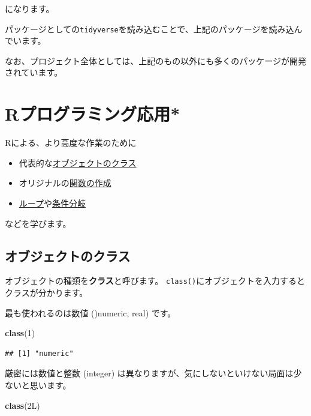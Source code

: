 \documentclass[]{bxjsreport}
\newenvironment{Shaded}{\begin{snugshade}}{\end{snugshade}}
\newcommand{\DecValTok}[1]{\textcolor[rgb]{0.00,0.00,0.81}{#1}}
\newcommand{\KeywordTok}[1]{\textcolor[rgb]{0.13,0.29,0.53}{\textbf{#1}}}
\newcommand{\NormalTok}[1]{#1}
\providecommand{\tightlist}{%
  \setlength{\itemsep}{0pt}\setlength{\parskip}{0pt}}
\let\asdf\section
\renewcommand{\section}{\chapter}
\renewcommand{\subsection}{\asdf}
\begin{document}
になります。

パッケージとしての\texttt{tidyverse}を読み込むことで、上記のパッケージを読み込んでいます。

なお、プロジェクト全体としては、上記のもの以外にも多くのパッケージが開発されています。

\hypertarget{inter-r}{%
\section{Rプログラミング応用*}\label{inter-r}}

Rによる、より高度な作業のために

\begin{itemize}
\tightlist
\item
  代表的な\protect\hyperlink{ux30aaux30d6ux30b8ux30a7ux30afux30c8ux306eux30afux30e9ux30b9}{オブジェクトのクラス}
\item
  オリジナルの\protect\hyperlink{ux95a2ux6570ux306eux4f5cux6210}{関数の作成}
\item
  \protect\hyperlink{ux30ebux30fcux30d7}{ループ}や\protect\hyperlink{ux6761ux4ef6ux5206ux5c90}{条件分岐}
\end{itemize}

などを学びます。

\hypertarget{ux30aaux30d6ux30b8ux30a7ux30afux30c8ux306eux30afux30e9ux30b9}{%
\subsection{オブジェクトのクラス}\label{ux30aaux30d6ux30b8ux30a7ux30afux30c8ux306eux30afux30e9ux30b9}}

オブジェクトの種類を\textbf{クラス}と呼びます。
\texttt{class()}にオブジェクトを入力するとクラスが分かります。

最も使われるのは数値 ()numeric, real) です。

\begin{Shaded}
\begin{Highlighting}[]
\KeywordTok{class}\NormalTok{(}\DecValTok{1}\NormalTok{)}
\end{Highlighting}
\end{Shaded}

\begin{verbatim}
## [1] "numeric"
\end{verbatim}

厳密には数値と整数 (integer) は異なりますが、気にしないといけない局面は少ないと思います。

\begin{Shaded}
\begin{Highlighting}[]
\KeywordTok{class}\NormalTok{(2L)}
\end{Highlighting}
\end{Shaded}
\end{document}
